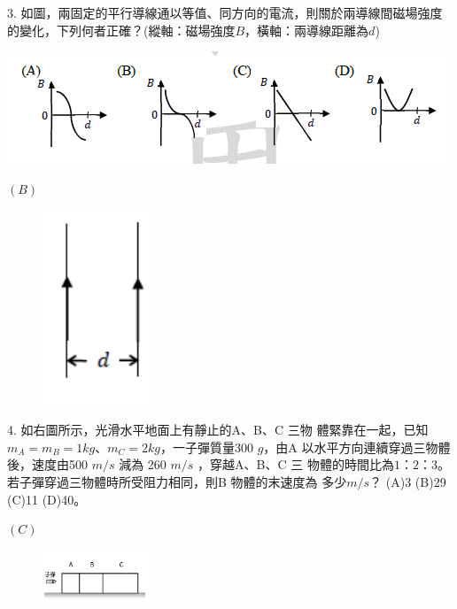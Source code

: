 \documentclass[cn,10pt,math=newtx]{elegantbook}
\begin{document}
\begin{example}
   3. 如圖，兩固定的平行導線通以等值、同方向的電流，則關於兩導線間磁場強度的變化，下列何者正確？(縱軸：磁場強度$B$，橫軸：兩導線距離為$d$)
\\
\begin{center}
\includegraphics[scale=1.2]{image/109全國3-1.png}
\end{center}

    \rightline{[全國聯招教甄109]}
\end{example}
\begin{solution}
    $(B)$
\end{solution}
\begin{figure}[htbp]
    \flushright
    \includegraphics[width=0.3\textwidth]{image/109全國3.png}
  \end{figure}
\newpage


\begin{example}
   4. 如右圖所示，光滑水平地面上有靜止的A、B、C 三物
體緊靠在一起，已知$m_A=m_B=1kg、m_C=2kg$，一子彈質量300 $g$，由A 以水平方向連續穿過三物體
後，速度由500 $m/s$ 減為 260 $m/s$ ，穿越A、B、C 三
物體的時間比為$1：2：3$。若子彈穿過三物體時所受阻力相同，則B 物體的末速度為
多少$m/s$？ (A)3 (B)29 (C)11 (D)40。\\
    \rightline{[全國聯招教甄109]}
\end{example}
\begin{solution}
    $(C)$
\end{solution}
\begin{figure}[htbp]
    \flushright
    \includegraphics[width=0.3\textwidth]{image/109全國4.png}
  \end{figure}
\newpage
\end{document}
